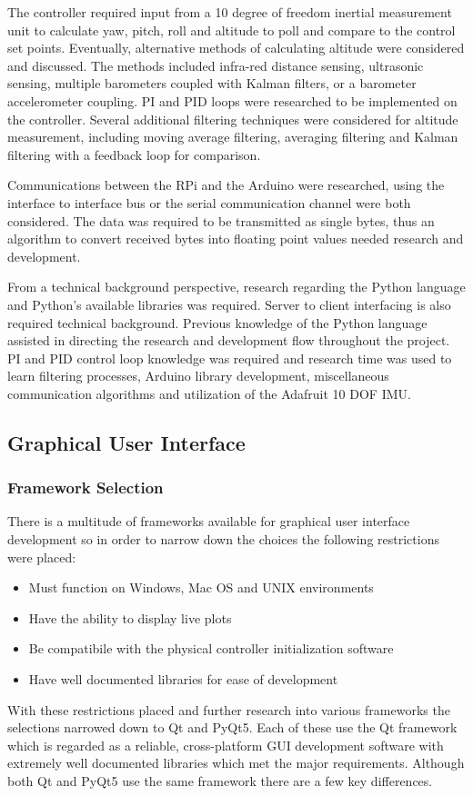 The controller required input from a 10 degree of freedom inertial measurement unit to calculate yaw, pitch, roll and altitude to poll and compare to the control set points. Eventually, alternative methods of calculating altitude were considered and discussed. The methods included infra-red distance sensing, ultrasonic sensing, multiple barometers coupled with Kalman filters, or a barometer accelerometer coupling. PI and PID loops were researched to be implemented on the controller. Several additional filtering techniques were considered for altitude measurement, including moving average filtering, averaging filtering and Kalman filtering with a feedback loop for comparison.

Communications between the RPi and the Arduino were researched, using the interface to interface bus or the serial communication channel were both considered. The data was required to be transmitted as single bytes, thus an algorithm to convert received bytes into floating point values needed research and development.

From a technical background perspective, research regarding the Python language and Python's available libraries was required. Server to client interfacing is also required technical background. Previous knowledge of the Python language assisted in directing the research and development flow throughout the project. PI and PID control loop knowledge was required and research time was used to learn filtering processes, Arduino library development, miscellaneous communication algorithms and utilization of the Adafruit 10 DOF IMU.



\subsection{Graphical User Interface}
\subsubsection{Framework Selection}

There is a multitude of frameworks available for graphical user interface development so in order to narrow down the choices the following restrictions were placed: 
\begin{itemize}
	\item Must function on Windows, Mac OS and UNIX environments
	\item Have the ability to display live plots
	\item Be compatibile with the physical controller initialization software
	\item Have well documented libraries for ease of development 
\end{itemize}
With these restrictions placed and further research into various frameworks the selections narrowed down to Qt and PyQt5. Each of these use the Qt framework which is regarded as a reliable, cross-platform GUI development software with extremely well documented libraries which met the major requirements. Although both Qt and PyQt5 use the same framework there are a few key differences. 

